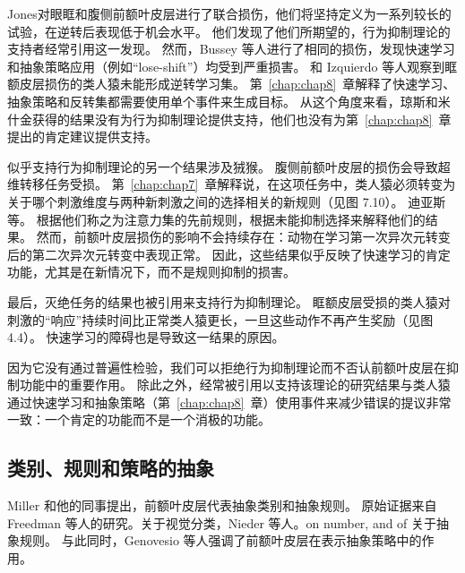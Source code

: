 Jones\cite{jones1972limbic}对眼眶和腹侧前额叶皮层进行了联合损伤，他们将坚持定义为一系列较长的试验，在逆转后表现低于机会水平。
他们发现了他们所期望的，行为抑制理论的支持者经常引用这一发现。
然而，Bussey 等人\cite{bussey2001role}进行了相同的损伤，发现快速学习和抽象策略应用（例如“lose-shift”）均受到严重损害。
和 Izquierdo 等人\cite{izquierdo2004bilateral}观察到眶额皮层损伤的类人猿未能形成逆转学习集。
第~\ref{chap:chap8}~章解释了快速学习、抽象策略和反转集都需要使用单个事件来生成目标。
从这个角度来看，琼斯和米什金获得的结果没有为行为抑制理论提供支持，他们也没有为第~\ref{chap:chap8}~章提出的肯定建议提供支持。
\par


似乎支持行为抑制理论的另一个结果涉及狨猴。
腹侧前额叶皮层的损伤会导致超维转移任务受损\cite{dias1996primate}。
第~\ref{chap:chap7}~章解释说，在这项任务中，类人猿必须转变为关于哪个刺激维度与两种新刺激之间的选择相关的新规则（见图 7.10）。
迪亚斯等。 根据他们称之为注意力集的先前规则，根据未能抑制选择来解释他们的结果。
然而，前额叶皮层损伤的影响不会持续存在：动物在学习第一次异次元转变后的第二次异次元转变中表现正常\cite{dias1997dissociable}。
因此，这些结果似乎反映了快速学习的肯定功能，尤其是在新情况下，而不是规则抑制的损害。
\par


最后，灭绝任务的结果也被引用来支持行为抑制理论\cite{butters1969retention}。
眶额皮层受损的类人猿对刺激的“响应”持续时间比正常类人猿更长，一旦这些动作不再产生奖励（见图 4.4）。
快速学习的障碍也是导致这一结果的原因。
\par


因为它没有通过普遍性检验，我们可以拒绝行为抑制理论而不否认前额叶皮层在抑制功能中的重要作用。
除此之外，经常被引用以支持该理论的研究结果与类人猿通过快速学习和抽象策略（第~\ref{chap:chap8}~章）使用事件来减少错误的提议非常一致：一个肯定的功能而不是一个消极的功能。



\subsection{类别、规则和策略的抽象}

Miller 和他的同事提出，前额叶皮层代表抽象类别\cite{miller2003neural,roy2010prefrontal}和抽象规则\cite{miller2007rules}。
原始证据来自 Freedman 等人的研究\cite{freedman2002visual}。关于视觉分类，Nieder 等人\cite{nieder2002representation}。on number, and of \cite{white1999rule,wallis2001single}关于抽象规则。
与此同时，Genovesio 等人\cite{genovesio2005prefrontal}强调了前额叶皮层在表示抽象策略中的作用。
\par


